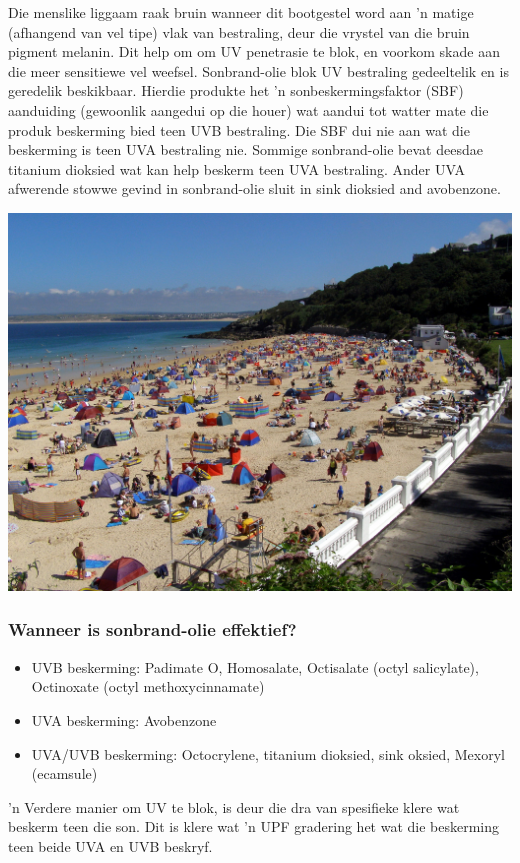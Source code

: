 \label{m38779*id189495}Die menslike liggaam raak bruin wanneer dit bootgestel word aan 'n matige (afhangend van vel tipe) vlak van bestraling, deur die vrystel van die bruin pigment melanin. Dit help om om UV penetrasie te blok, en voorkom skade aan die meer sensitiewe vel weefsel. Sonbrand-olie blok UV bestraling gedeeltelik en is geredelik beskikbaar. Hierdie produkte het 'n sonbeskermingsfaktor (SBF) aanduiding (gewoonlik aangedui op die houer) wat aandui tot watter mate die produk beskerming bied teen UVB bestraling. Die SBF dui nie aan wat die beskerming is teen UVA bestraling nie. Sommige sonbrand-olie bevat deesdae titanium dioksied wat kan help beskerm teen UVA bestraling. Ander UVA afwerende stowwe gevind in sonbrand-olie sluit in sink dioksied and avobenzone. \par 
\label{m38779*secfhsst!!!underscore!!!id701}
\begin{minipage}{.5\textwidth}
\includegraphics[width=.8\columnwidth]{photos/beach2_treehouse1977.jpg}
\end{minipage}
\begin{minipage}{.5\textwidth}
            \subsubsection*{Wanneer is sonbrand-olie effektief? }
            \nopagebreak
        \label{m38779*id189518}\begin{itemize}[noitemsep]
            \label{m38779*uid18}\item UVB beskerming: Padimate O, Homosalate, Octisalate (octyl salicylate), Octinoxate (octyl methoxycinnamate)
\label{m38779*uid19}\item UVA beskerming: Avobenzone
\label{m38779*uid20}\item UVA/UVB beskerming: Octocrylene, titanium dioksied, sink oksied, Mexoryl (ecamsule)
\end{itemize}
        \label{m38779*id189561} 'n Verdere manier om UV te blok, is deur die dra van spesifieke klere wat beskerm teen die son. Dit is klere wat 'n UPF gradering het wat die beskerming teen beide UVA en UVB beskryf. \par 
      \label{m38779*uid21}
\end{minipage}
